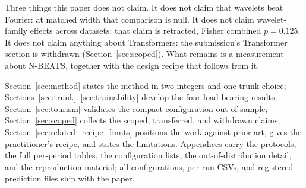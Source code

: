 Three things this paper does not claim. It does not claim that wavelets beat Fourier: at matched
width that comparison is null. It does not claim wavelet-family effects across datasets: that
claim is retracted, Fisher combined $p = 0.125$. It does not claim anything about Transformers:
the submission's Transformer section is withdrawn (Section~\ref{sec:scoped}). What remains is a
measurement about N-BEATS, together with the design recipe that follows from it.

Section~\ref{sec:method} states the method in two integers and one trunk choice;
Sections~\ref{sec:trunk}--\ref{sec:trainability} develop the four load-bearing results;
Section~\ref{sec:tourism} validates the compact configuration out of sample;
Section~\ref{sec:scoped} collects the scoped, transferred, and withdrawn claims;
Section~\ref{sec:related_recipe_limits} positions the work against prior art, gives the
practitioner's recipe, and states the limitations. Appendices carry the protocols, the full
per-period tables, the configuration lists, the out-of-distribution detail, and the reproduction
material; all configurations, per-run CSVs, and registered prediction files ship with the paper.
